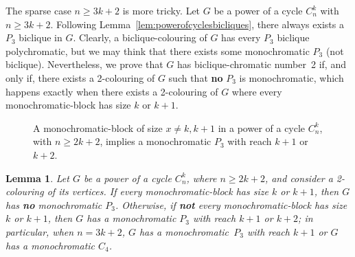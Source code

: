 \documentclass{article}
\newtheorem{lemma}[theorem]{Lemma}
\begin{document}
The sparse case $n \geq 3k + 2$ is more tricky. Let $G$ be a power of a cycle
$C_{n}^{k}$ with $n \geq 3k + 2$. Following
Lemma~\ref{lem:powerofcyclesbicliques}, there always exists a $P_3$ biclique in
$G$. Clearly, a biclique-colouring of $G$ has every $P_3$ biclique
polychromatic, but we may think that there exists some monochromatic $P_3$ (not
biclique). Nevertheless, we prove that $G$ has biclique-chromatic number~2 if,
and only if, there exists a 2-colouring of $G$ such that \textbf{no} $P_3$ is
monochromatic, which happens exactly when there exists a 2-colouring of $G$
where every monochromatic-block has size $k$ or $k + 1$.

\begin{figure}[t]
\centering
	\qquad
	\qquad
	\caption{A monochromatic-block of size $x \neq k, k+1$ in a power of a cycle
	$C_{n}^{k}$, with $n \geq 2k + 2$, implies a monochromatic $P_{3}$ with reach
	$k+1$ or $k+2$.}
	\label{fig:catarinav2}
\end{figure}

\begin{lemma}
\label{l:iff}
Let $G$ be a power of a cycle $C_n^k$, where $n \geq 2k + 2$, and consider a
2-colouring of its vertices. If every monochromatic-block has size $k$ or
$k+1$, then $G$ has \textbf{no} monochromatic $P_3$. Otherwise, if
\textbf{not} every monochromatic-block has size $k$ or $k+1$, then $G$ has
a monochromatic $P_3$ with reach $k+1$ or $k+2$; in particular, when
$n = 3k + 2$, $G$ has a monochromatic~$P_3$ with reach $k+1$ or
$G$ has a monochromatic $C_4$.
\end{lemma}
\end{document}
